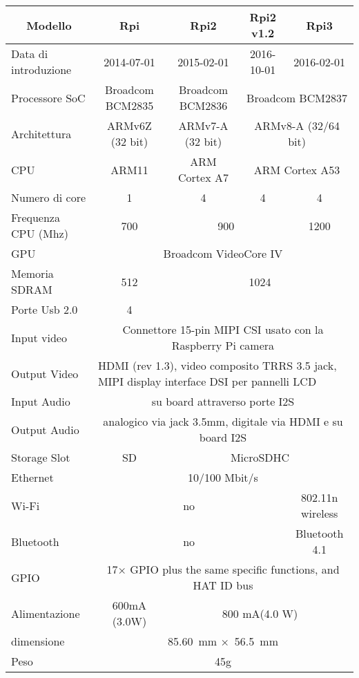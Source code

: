\begin{landscape}
\begin{table}[htbp]
	\caption{}
	\begin{tabular}{|l|c|c|c|c|}
		\hline
		\multicolumn{1}{|c|}{\textbf{Modello}} & \textbf{Rpi} & \textbf{Rpi2} & \textbf{Rpi2 v1.2} & \textbf{Rpi3} \\ \hline
		Data di introduzione & 2014-07-01 & 2015-02-01 & 2016-10-01 & 2016-02-01 \\ \hline
		Processore SoC & Broadcom BCM2835 & Broadcom BCM2836 & \multicolumn{ 2}{c|}{Broadcom BCM2837} \\ \hline
		Architettura & ARMv6Z (32 bit) & ARMv7-A (32 bit) & \multicolumn{ 2}{c|}{ARMv8-A (32/64 bit)} \\ \hline
		CPU & ARM11 & ARM Cortex A7 & \multicolumn{ 2}{c|}{ARM Cortex A53} \\ \hline
		Numero di core & 1 & 4 & 4 & 4 \\ \hline
		Frequenza CPU (Mhz) & 700 & \multicolumn{ 2}{c|}{900} & 1200 \\ \hline
		GPU & \multicolumn{ 4}{c|}{Broadcom VideoCore IV} \\ \hline
		Memoria SDRAM & 512 & \multicolumn{ 3}{c|}{1024} \\ \hline
		Porte Usb 2.0 & 4 &  &  &  \\ \hline
		Input video & \multicolumn{ 4}{c|}{Connettore 15-pin MIPI  CSI usato con la Raspberry Pi camera} \\ \hline
		Output Video & \multicolumn{ 4}{l|}{HDMI (rev 1.3), video composito TRRS 3.5 jack, MIPI display interface DSI per pannelli LCD} \\ \hline
		Input Audio & \multicolumn{ 4}{c|}{su board attraverso porte I2S} \\ \hline
		Output Audio & \multicolumn{ 4}{c|}{analogico via jack 3.5mm, digitale via HDMI e su board I2S} \\ \hline
		Storage Slot & SD & \multicolumn{ 3}{c|}{MicroSDHC} \\ \hline
		Ethernet & \multicolumn{ 4}{c|}{10/100 Mbit/s} \\ \hline
		Wi-Fi & \multicolumn{ 3}{c|}{no} & 802.11n wireless \\ \hline
		Bluetooth & \multicolumn{ 3}{c|}{no} & Bluetooth 4.1 \\ \hline
		GPIO & \multicolumn{ 4}{c|}{17× GPIO plus the same specific functions, and HAT ID bus } \\ \hline
		Alimentazione & 600mA (3.0W) & \multicolumn{ 3}{c|}{800 mA(4.0 W)} \\ \hline
		dimensione & \multicolumn{ 4}{c|}{85.60 mm × 56.5 mm } \\ \hline
		Peso  & \multicolumn{ 4}{c|}{45g} \\ \hline
	\end{tabular}
	\label{tab:rpi_ver}
\end{table}
\end{landscape}

